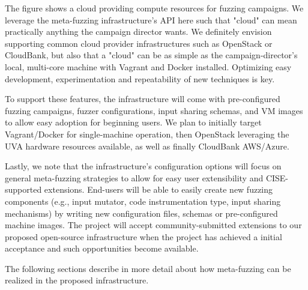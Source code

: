 The figure shows a cloud providing compute resources for fuzzing campaigns.  
We leverage the meta-fuzzing infrastructure's API here such that "cloud" can 
mean practically anything the campaign director wants.  We definitely envision
supporting common cloud provider infrastructures such as OpenStack or CloudBank, but
also that a "cloud" can be as simple as the campaign-director's local, multi-core machine 
with Vagrant and Docker installed.  Optimizing easy development, experimentation and repeatability
of new techniques is key. 

To support these features, the infrastructure will come with pre-configured 
fuzzing campaigns, fuzzer configurations, input sharing schemas, and VM images to allow easy adoption for 
beginning users.  We plan to initially target Vagrant/Docker for single-machine operation, then OpenStack leveraging the UVA 
hardware resources available, as well as finally CloudBank AWS/Azure.

Lastly, we note that the infrastructure's configuration options will focus on general meta-fuzzing strategies 
to allow for easy user extensibility and CISE-supported extensions.  
End-users will be able to easily create 
new fuzzing components (e.g., input mutator, code instrumentation type, input 
sharing mechanisms) by writing new configuration files, schemas or 
pre-configured machine images.  The project will accept 
community-submitted extensions to our proposed open-source infrastructure when 
the project has achieved a initial acceptance and such opportunities become available.


The following sections describe in more detail about how meta-fuzzing can be realized 
in the proposed infrastructure.



